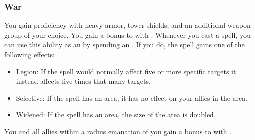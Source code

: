         \subsubsection{War}
             You gain proficiency with heavy armor, tower shields, and an additional weapon group of your choice.
             You gain a  bonus to  with .
             Whenever you cast a spell, you can use this ability as an  by spending an .
            If you do, the spell gains one of the following effects:
            \begin{itemize}
                \item Legion: If the spell would normally affect five or more specific targets it instead affects five times that many targets.
                \item Selective: If the spell has an area, it has no effect on your allies in the area.
                \item Widened: If the spell has an area, the size of the area is doubled.
            \end{itemize}
             You and all allies within a \arealarge radius emanation of you gain a  bonus to  with .

